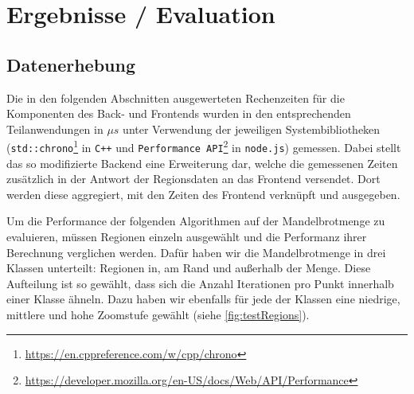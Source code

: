 \section{Ergebnisse / Evaluation}


\subsection{Datenerhebung}
Die in den folgenden Abschnitten ausgewerteten Rechenzeiten für die Komponenten des Back- und
Frontends wurden in den entsprechenden Teilanwendungen in \( \mu s \) unter Verwendung der jeweiligen
Systembibliotheken (\verb|std::chrono|\footnote{\url{https://en.cppreference.com/w/cpp/chrono}} in \verb|C++| und \verb|Performance API|\footnote{\url{https://developer.mozilla.org/en-US/docs/Web/API/Performance}} in \verb|node.js|) gemessen.
Dabei stellt das so modifizierte Backend eine Erweiterung dar,
welche die gemessenen Zeiten zusätzlich in der Antwort der Regionsdaten an das Frontend
versendet. Dort werden diese aggregiert, mit den Zeiten des Frontend verknüpft und ausgegeben.

Um die Performance der folgenden Algorithmen auf der Mandelbrotmenge zu evaluieren,
müssen Regionen einzeln ausgewählt und die Performanz ihrer Berechnung verglichen werden.
Dafür haben wir die Mandelbrotmenge in drei Klassen unterteilt: Regionen in, am Rand und außerhalb
der Menge. Diese Aufteilung ist so gewählt, dass sich die Anzahl Iterationen pro Punkt innerhalb einer Klasse ähneln.
Dazu haben wir ebenfalls für jede der Klassen eine niedrige, mittlere und hohe Zoomstufe gewählt (siehe \autoref{fig:testRegions}).

